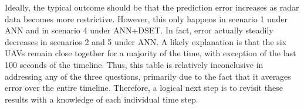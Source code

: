 \documentclass[12pt]{uthesis-v12}  %
\begin{document}
Ideally, the typical outcome should be that the prediction error increases as radar data becomes more restrictive. However, this only happens in scenario 1 under ANN and in scenario 4 under ANN+DSET. In fact, error actually steadily decreases in scenarios 2 and 5 under ANN. A likely explanation is that the six UAVs remain close together for a majority of the time, with exception of the last 100 seconds of the timeline. Thus, this table is relatively inconclusive in addressing any of the three questions, primarily due to the fact that it averages error over the entire timeline. Therefore, a logical next step is to revisit these results with a knowledge of each individual time step.


\begin{figure}\centering
{}
	\hfill	
{}
		
	\hfill	
{}
		

\end{figure}
\end{document}
